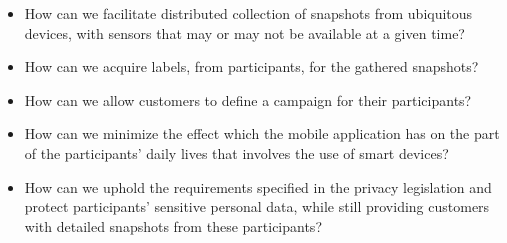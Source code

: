 



\begin{itemize}
	\setlength\itemsep{-0.2em}
    \item How can we facilitate distributed collection of snapshots from ubiquitous devices, with sensors that may or may not be available at a given time?

    \item How can we acquire labels, from participants, for the gathered snapshots?  
    
    \item How can we allow customers to define a campaign for their participants?
    
    \item How can we minimize the effect which the mobile application has on the part of the participants' daily lives that involves the use of smart devices?

    \item How can we uphold the requirements specified in the privacy legislation and protect participants' sensitive personal data, while still providing customers with detailed snapshots from these participants? 
\end{itemize}


